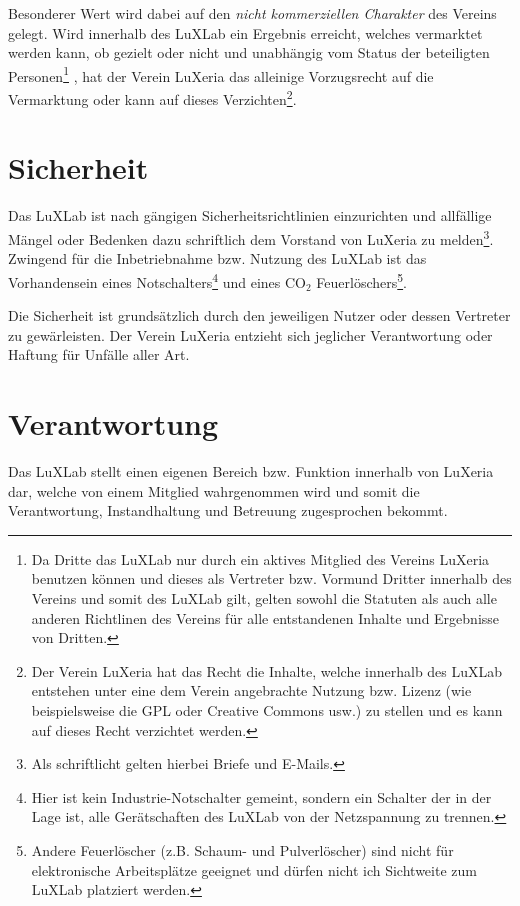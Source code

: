 \documentclass[a4paper,
               10pt,
               fleqn]{article}
\begin{document}
Besonderer Wert wird dabei auf den \emph{nicht kommerziellen Charakter} des
Vereins gelegt. Wird innerhalb des LuXLab ein Ergebnis erreicht, welches 
vermarktet werden kann, 
ob gezielt oder nicht und unabhängig vom Status der beteiligten Personen\footnote{
    Da Dritte das LuXLab nur durch ein aktives Mitglied des Vereins LuXeria
    benutzen können und dieses als Vertreter bzw. Vormund Dritter innerhalb des
    Vereins und somit des LuXLab gilt, gelten sowohl die Statuten 
    als auch alle anderen Richtlinen des
    Vereins für alle entstandenen Inhalte und Ergebnisse von Dritten.}
, hat der Verein LuXeria das alleinige Vorzugsrecht auf die Vermarktung 
oder kann auf dieses Verzichten\footnote{Der Verein LuXeria hat das
    Recht die Inhalte, welche innerhalb des LuXLab entstehen unter
    eine dem Verein angebrachte Nutzung bzw. Lizenz (wie beispielsweise
    die GPL oder Creative Commons usw.) zu stellen und 
    es kann auf dieses Recht verzichtet werden.}.

\section{Sicherheit}
Das LuXLab ist nach gängigen Sicherheitsrichtlinien einzurichten und
allfällige Mängel oder Bedenken dazu schriftlich dem Vorstand von LuXeria
zu melden\footnote{
    Als schriftlicht gelten hierbei Briefe und E-Mails.}.
Zwingend für die Inbetriebnahme bzw. Nutzung des LuXLab ist das Vorhandensein
eines Notschalters\footnote{
    Hier ist kein Industrie-Notschalter gemeint, sondern ein Schalter der
    in der Lage ist, alle Gerätschaften des LuXLab von der Netzspannung
    zu trennen.}
und eines CO$_2$ Feuerlöschers\footnote{
    Andere Feuerlöscher (z.B. Schaum- und Pulverlöscher) sind nicht für
    elektronische Arbeitsplätze geeignet und dürfen nicht ich Sichtweite
    zum LuXLab platziert werden.}.
    
Die Sicherheit ist grundsätzlich durch den jeweiligen Nutzer oder dessen
Vertreter zu gewärleisten.
Der Verein LuXeria entzieht sich jeglicher Verantwortung oder Haftung für 
Unfälle aller Art.

\section{Verantwortung}
Das LuXLab stellt einen eigenen Bereich bzw. Funktion innerhalb von LuXeria 
dar, welche von einem Mitglied wahrgenommen wird und somit die 
Verantwortung, Instandhaltung und Betreuung zugesprochen bekommt.
\end{document}
